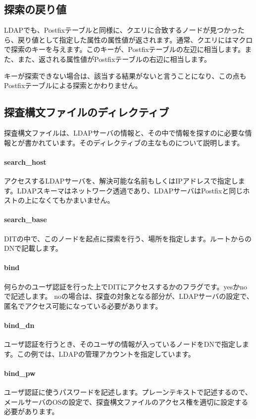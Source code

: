 \subsection{探索の戻り値}

LDAPでも、Postfixテーブルと同様に、クエリに合致するノードが見つかったら、戻り値として指定した属性の属性値が返されます。通常、クエリにはマクロで探索のキーを与えます。このキーが、Postfixテーブルの左辺に相当します。また、また、返される属性値がPostfixテーブルの右辺に相当します。

キーが探索できない場合は、該当する結果がないと言うことになり、この点もPostfixテーブルによる探索とかわりません。


\subsection{探査構文ファイルのディレクティブ}

探査構文ファイルは、LDAPサーバの情報と、その中で情報を探すのに必要な情報とが書かれています。そのディレクティブの主なものについて説明します。

\paragraph{search\_host}
アクセスするLDAPサーバを、解決可能な名前もしくはIPアドレスで指定します。LDAPスキーマはネットワーク透過であり、LDAPサーバはPostfixと同じホストの上になくてもかまいません。

\paragraph{search\_base}
DITの中で、このノードを起点に探索を行う、場所を指定します。ルートからのDNで記載します。

\paragraph{bind}
何らかのユーザ認証を行った上でDITにアクセスするかのフラグです。yesかnoで記述します。
noの場合は、探査の対象となる部分が、LDAPサーバの設定で、匿名でアクセス可能になっている必要があります。

\paragraph{bind\_dn}
ユーザ認証を行うとき、そのユーザの情報が入っているノードをDNで指定します。この例では、LDAPの管理アカウントを指定しています。

\paragraph{bind\_pw}
ユーザ認証に使うパスワードを記述します。プレーンテキストで記述するので、メールサーバのOSの設定で、探査構文ファイルのアクセス権を適切に設定する必要があります。

